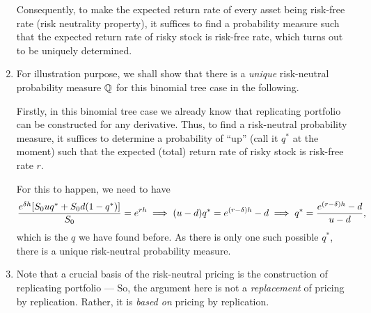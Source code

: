 \begin{enumerate}
\begin{intuition}
Consequently, to make the expected return rate of every asset being risk-free
rate (risk neutrality property), it suffices to find a probability measure such
that the expected return rate of risky stock  is risk-free
rate, which turns out to be uniquely determined.
\end{intuition}

\item For illustration purpose, we shall show that there is a \emph{unique}
risk-neutral probability measure \(\mathbb{Q}\) for this binomial tree case in the
following.

\begin{pf}
Firstly, in this binomial tree case we already know that replicating portfolio
can be constructed for any derivative. Thus, to find a risk-neutral probability
measure, it suffices to determine a probability of ``up'' (call it \(q^*\) at
the moment) such that the expected (total) return rate of risky stock
 is risk-free rate \(r\).

For this to happen, we need to have
\[
\frac{e^{\delta h}\qty[S_0uq^*+S_0d(1-q^*)]}{S_0}=e^{rh}
\implies
(u-d)q^*=e^{(r-\delta)h}-d
\implies
q^*=\frac{e^{(r-\delta)h}-d}{u-d},
\]
which is the \(q\) we have found before. As there is only one such possible
\(q^*\), there is a unique risk-neutral probability measure.
\end{pf}

\item Note that a crucial basis of the risk-neutral pricing is the construction of
replicating portfolio --- So, the argument here is not a \emph{replacement} of
pricing by replication. Rather, it is \emph{based on} pricing by replication.
\end{enumerate}

